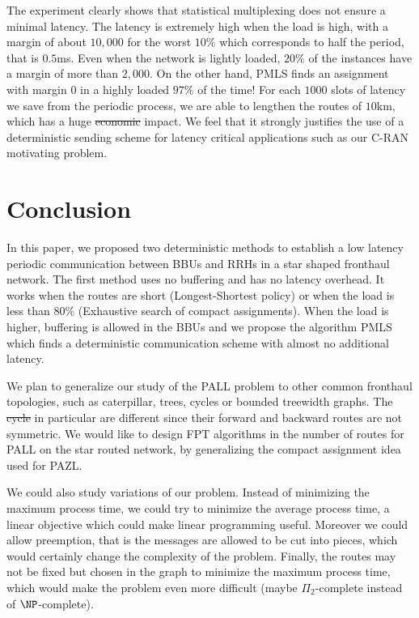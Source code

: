 \documentclass[10pt, conference, letterpaper]{IEEEtran}
\providecommand{\DIFaddtex}[1]{{\protect\color{blue}\uwave{#1}}} %
\providecommand{\DIFdeltex}[1]{{\protect\color{red}\sout{#1}}}                      %
\providecommand{\DIFaddbegin}{} %
\providecommand{\DIFaddend}{} %
\providecommand{\DIFdelbegin}{} %
\providecommand{\DIFdelend}{} %
\providecommand{\DIFadd}[1]{\texorpdfstring{\DIFaddtex{#1}}{#1}} %
\providecommand{\DIFdel}[1]{\texorpdfstring{\DIFdeltex{#1}}{}} %
\newcommand{\DIFscaledelfig}{0.5}
\newlength{\DIFdelgraphicswidth} %
\newlength{\DIFdelgraphicsheight} %
\newcommand{\DIFaddincludegraphics}[2][]{{\color{blue}\fbox{\DIFOincludegraphics[#1]{#2}}}} %
\newcommand{\DIFdelincludegraphics}[2][]{%
\sbox{\DIFdelgraphicsbox}{\DIFOincludegraphics[#1]{#2}}%
\settoboxwidth{\DIFdelgraphicswidth}{\DIFdelgraphicsbox} %
\settoboxtotalheight{\DIFdelgraphicsheight}{\DIFdelgraphicsbox} %
\scalebox{\DIFscaledelfig}{%
\parbox[b]{\DIFdelgraphicswidth}{\usebox{\DIFdelgraphicsbox}\\[-\baselineskip] \rule{\DIFdelgraphicswidth}{0em}}\llap{\resizebox{\DIFdelgraphicswidth}{\DIFdelgraphicsheight}{%
\setlength{\unitlength}{\DIFdelgraphicswidth}%
\begin{picture}(1,1)%
\thicklines\linethickness{2pt} %
{\color[rgb]{1,0,0}\put(0,0){\framebox(1,1){}}}%
{\color[rgb]{1,0,0}\put(0,0){\line( 1,1){1}}}%
{\color[rgb]{1,0,0}\put(0,1){\line(1,-1){1}}}%
\end{picture}%
}\hspace*{3pt}}} %
} %
\DeclareRobustCommand{\DIFaddbegin}{\DIFOaddbegin \let\includegraphics\DIFaddincludegraphics} %
\DeclareRobustCommand{\DIFaddend}{\DIFOaddend \let\includegraphics\DIFOincludegraphics} %
\DeclareRobustCommand{\DIFdelbegin}{\DIFOdelbegin \let\includegraphics\DIFdelincludegraphics} %
\DeclareRobustCommand{\DIFdelend}{\DIFOaddend \let\includegraphics\DIFOincludegraphics} %
\begin{document}
     The experiment clearly shows that statistical multiplexing does not ensure a minimal latency. 
     The latency is extremely high when the load is high, with a margin of about $10,000$ for the worst $10\%$ which corresponds to half the period, that is $0.5$ms. Even when the network is lightly loaded, $20\%$ of the instances have a margin of more than $2,000$. On the other hand, PMLS finds an assignment with margin $0$ in a highly loaded $97\%$ of the time! 
     For each $1000$ slots of latency we save from the periodic process, we are able to lengthen the routes of $10$km, which has a huge \DIFdelbegin \DIFdel{economic }\DIFdelend \DIFaddbegin \DIFadd{economical }\DIFaddend impact.
     We feel that it strongly justifies the use of a deterministic sending scheme for latency critical applications such as our C-RAN motivating problem.     

 \section{Conclusion}
In this paper, we proposed two deterministic methods to establish a low latency periodic communication between BBUs and RRHs in 
a star shaped fronthaul network. The first method uses no buffering and has no latency overhead. It works when the routes are short (Longest-Shortest policy) or when the load is less than $80\%$ (Exhaustive search of compact assignments).  
When the load is higher, buffering is allowed in the BBUs and we propose the algorithm PMLS which  finds a deterministic communication scheme with almost no additional latency.
% 

   
   We plan to generalize our study of the PALL problem to other common fronthaul topologies,
   such as caterpillar, trees, cycles or bounded treewidth graphs.  The \DIFdelbegin \DIFdel{cycle }\DIFdelend \DIFaddbegin \DIFadd{cycles }\DIFaddend in particular are 
   different since their forward and backward routes are not symmetric.
   We would like to design FPT algorithms in the number of routes for PALL on the star routed network, by generalizing the compact assignment idea used for PAZL. 

   We could also study variations of our problem. Instead of minimizing the maximum process time, we could try to minimize the average process time, a linear objective which could make linear programming useful.
   Moreover we could allow preemption, that is the messages are allowed to be cut into pieces, which would certainly change the complexity of the problem. 
   Finally, the routes may not be fixed but chosen in the graph to minimize the maximum process time, which would make the problem even more difficult (maybe $\Pi_2$-complete instead of $\NP$-complete). 

%   



\end{document}
